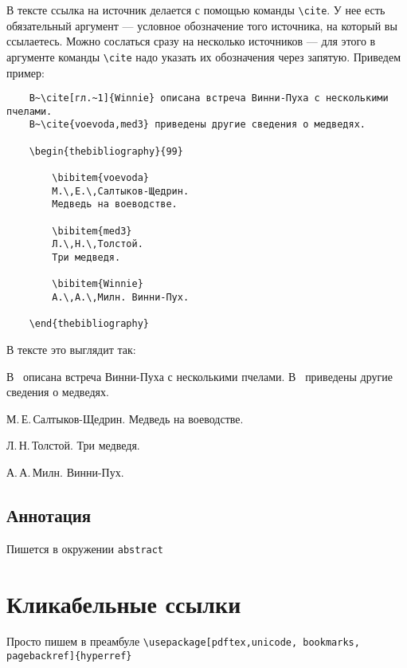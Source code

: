 \documentclass[a4paper,11pt]{article} %
\begin{document}
В тексте ссылка на источник делается с помощью команды \verb"\cite".
У нее есть обязательный аргумент --- условное обозначение того источника, на который вы ссылаетесь. Можно сослаться сразу на несколько источников --- для этого в аргументе команды \verb"\cite" надо указать их обозначения через запятую. Приведем пример:

\begin{verbatim}
	В~\cite[гл.~1]{Winnie} описана встреча Винни-Пуха с несколькими пчелами.
	В~\cite{voevoda,med3} приведены другие сведения о медведях.
	
	\begin{thebibliography}{99}
		
		\bibitem{voevoda}
		М.\,Е.\,Салтыков-Щедрин.
		Медведь на воеводстве.
		
		\bibitem{med3} 
		Л.\,Н.\,Толстой.
		Три медведя.
		
		\bibitem{Winnie}
		А.\,А.\,Милн. Винни-Пух.
		
	\end{thebibliography}
\end{verbatim}
	
В тексте это выглядит так:\vspace{0,5cm}

В~\cite[гл.~1]{Winnie} описана встреча Винни-Пуха с несколькими пчелами.
В~\cite{voevoda,med3} приведены другие сведения о медведях.

\begin{thebibliography}{99}
	
	М.\,Е.\,Салтыков-Щедрин.
	Медведь на воеводстве.
	
	Л.\,Н.\,Толстой.
	Три медведя.
	
	А.\,А.\,Милн. Винни-Пух.
	
\end{thebibliography}

\subsection{Аннотация}

Пишется в окружении {\tt abstract}

\section{Кликабельные ссылки}

Просто пишем в преамбуле \verb"\usepackage[pdftex,unicode, bookmarks, pagebackref]{hyperref}" 
\end{document}
